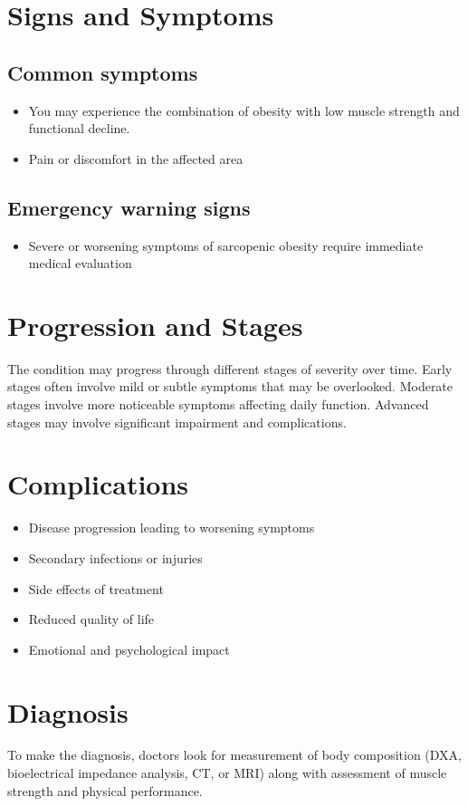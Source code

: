 \section{Signs and Symptoms}
\subsection{Common symptoms}
\begin{itemize}[noitemsep]
  \item You may experience the combination of obesity with low muscle strength and functional decline.
  \item Pain or discomfort in the affected area
  \end{itemize}
\subsection{Emergency warning signs}
\begin{itemize}[noitemsep]
  \item Severe or worsening symptoms of sarcopenic obesity require immediate medical evaluation
\end{itemize}
\section{Progression and Stages}
The condition may progress through different stages of severity over time. Early stages often involve mild or subtle symptoms that may be overlooked. Moderate stages involve more noticeable symptoms affecting daily function. Advanced stages may involve significant impairment and complications.
\section{Complications}
\begin{itemize}[noitemsep]
  \item Disease progression leading to worsening symptoms
  \item Secondary infections or injuries
  \item Side effects of treatment
  \item Reduced quality of life
  \item Emotional and psychological impact
\end{itemize}
\section{Diagnosis}
To make the diagnosis, doctors look for measurement of body composition (DXA, bioelectrical impedance analysis, CT, or MRI) along with assessment of muscle strength and physical performance.

